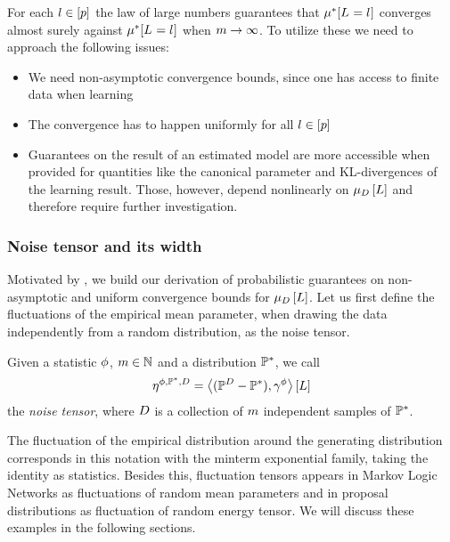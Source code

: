 For each $l\in[p]$ the law of large numbers guarantees that $\mu^*[L_{}=l_{}]$ converges almost surely against $\mu^*[L_{}=l_{}]$ when $m\rightarrow\infty$.
To utilize these we need to approach the following issues:
\begin{itemize}
    \item We need non-asymptotic convergence bounds, since one has access to finite data when learning
    \item The convergence has to happen uniformly for all $l\in[p]$
    \item Guarantees on the result of an estimated model are more accessible when provided for quantities like the canonical parameter and KL-divergences of the learning result.
    Those, however, depend nonlinearly on $\mu_{D}\left[L\right]$ and therefore require further investigation.
\end{itemize}

\subsubsection{Noise tensor and its width}

Motivated by , we build our derivation of probabilistic guarantees on non-asymptotic and uniform convergence bounds for $\mu_{D}\left[L\right]$.
Let us first define the fluctuations of the empirical mean parameter, when drawing the data independently from a random distribution, as the noise tensor.

\begin{definition}
    Given a statistic $\phi$, $m\in\mathbb{N}$ and a distribution $\mathbb{P}^*$, we call
    \[ \eta^{\phi,\mathbb{P}^*,D} = \left\langle (\mathbb{P}^{D}-\mathbb{P}^*),\gamma^{\phi}\right\rangle \left[ L \right] \]
    the \emph{noise tensor}, where $D$ is a collection of $m$ independent samples of $\mathbb{P}^*$.
\end{definition}

The fluctuation of the empirical distribution around the generating distribution corresponds in this notation with the minterm exponential family, taking the identity as statistics.
Besides this, fluctuation tensors appears in Markov Logic Networks as fluctuations of random mean parameters and in proposal distributions as fluctuation of random energy tensor.
We will discuss these examples in the following sections.



